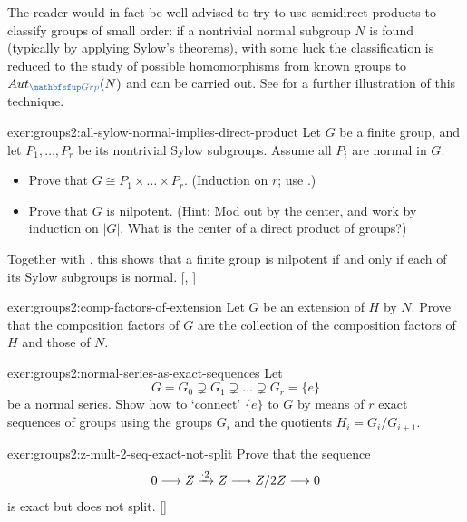 The reader would in fact be well-advised to try to use semidirect
products to classify groups of small order: if a nontrivial normal
subgroup $N$ is found (typically by applying Sylow's theorems), with
some luck the classification is reduced to the study of possible
homomorphisms from known groups to $\Aut_{\categ{Grp}}(N)$ and can be
carried out. See  for a
further illustration of this technique.
\begin{exer}{}{exer:groups2:all-sylow-normal-implies-direct-product}
  \exerused{} Let $G$ be a finite group, and let $P_1, \dots, P_r$ be
  its nontrivial Sylow subgroups. Assume all $P_i$ are normal in $G$.
  \begin{itemize}
  \item Prove that $G \cong P_1 \times \dots \times P_r$. (Induction
    on $r$; use .)
  \item Prove that $G$ is nilpotent. (Hint: Mod out by the center, and
    work by induction on $|G|$. What is the center of a direct product
    of groups?)
  \end{itemize}
  Together with
  , this shows
  that a finite group is nilpotent if and only if each of its Sylow
  subgroups is
  normal. [,
  ]
\end{exer}
\begin{exer}{}{exer:groups2:comp-factors-of-extension}
  Let $G$ be an extension of $H$ by $N$. Prove that the composition
  factors of $G$ are the collection of the composition factors of $H$
  and those of $N$.
\end{exer}
\begin{exer}{}{exer:groups2:normal-series-as-exact-sequences}
  Let
  \[G = G_0 \supsetneq G_1 \supsetneq \dots \supsetneq G_r = \{e\}\]
  be a normal series. Show how to `connect' $\{e\}$ to $G$ by means of
  $r$ exact sequences of groups using the groups $G_i$ and the
  quotients $H_i = G_i/G_{i+1}$.
\end{exer}
\begin{exer}{}{exer:groups2:z-mult-2-seq-exact-not-split}
  \exerused{} Prove that the sequence
  \[0 \longrightarrow Z \xrightarrow{\cdot 2} Z \longrightarrow
    Z/2Z \longrightarrow 0\] is exact but does not
  split. []
\end{exer}
